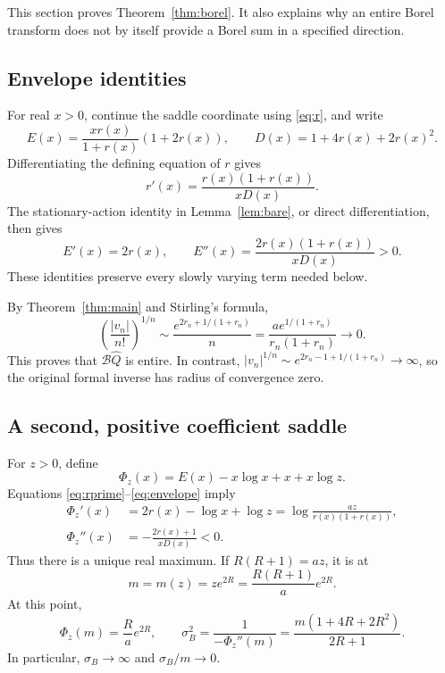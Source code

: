 \documentclass[11pt,a4paper]{article}
\numberwithin{equation}{section}
\theoremstyle{definition}\newtheorem{definition}[theorem]{Definition}
\theoremstyle{remark}\newtheorem{remark}[theorem]{Remark}
\theoremstyle{definition}
\newcommand{\Q}{\widehat Q}
\newcommand{\Bcal}{\mathcal B}
\begin{document}
This section proves Theorem~\ref{thm:borel}. It also explains why an entire
Borel transform does not by itself provide a Borel sum in a specified
direction.

\subsection{Envelope identities}
For real \(x>0\), continue the saddle coordinate using \eqref{eq:r}, and
write
\[
 E(x)=\frac{x r(x)}{1+r(x)}(1+2r(x)),\qquad
 D(x)=1+4r(x)+2r(x)^2.
\]
Differentiating the defining equation of \(r\) gives
\begin{equation}
 r'(x)=\frac{r(x)(1+r(x))}{xD(x)}.
 \label{eq:rprime}
\end{equation}
The stationary-action identity in Lemma~\ref{lem:bare}, or direct
differentiation, then gives
\begin{equation}
 E'(x)=2r(x),\qquad
 E''(x)=\frac{2r(x)(1+r(x))}{xD(x)}>0.
 \label{eq:envelope}
\end{equation}
These identities preserve every slowly varying term needed below.

By Theorem~\ref{thm:main} and Stirling's formula,
\[
 \left(\frac{|v_n|}{n!}\right)^{1/n}
 \sim\frac{e^{2r_n+1/(1+r_n)}}{n}
 =\frac{a e^{1/(1+r_n)}}{r_n(1+r_n)}\longrightarrow0.
\]
This proves that \(\Bcal\Q\) is entire. In contrast,
\(|v_n|^{1/n}\sim e^{2r_n-1+1/(1+r_n)}\to\infty\), so the original
formal inverse has radius of convergence zero.

\subsection{A second, positive coefficient saddle}
For \(z>0\), define
\begin{equation}
 \Phi_z(x)=E(x)-x\log x+x+x\log z.
 \label{eq:borelphase}
\end{equation}
Equations \eqref{eq:rprime}--\eqref{eq:envelope} imply
\begin{align}
 \Phi_z'(x)
 &=2r(x)-\log x+\log z
   =\log\frac{az}{r(x)(1+r(x))},\\
 \Phi_z''(x)&=-\frac{2r(x)+1}{xD(x)}<0.
 \label{eq:borelderivatives}
\end{align}
Thus there is a unique real maximum. If \(R(R+1)=az\), it is at
\begin{equation}
 m=m(z)=z e^{2R}=\frac{R(R+1)}a e^{2R}.
 \label{eq:borelm}
\end{equation}
At this point,
\begin{equation}
 \Phi_z(m)=\frac Ra e^{2R},\qquad
 \sigma_B^2=\frac1{-\Phi_z''(m)}
           =\frac{m(1+4R+2R^2)}{2R+1}.
 \label{eq:borelsaddle}
\end{equation}
In particular, \(\sigma_B\to\infty\) and \(\sigma_B/m\to0\).
\end{document}
